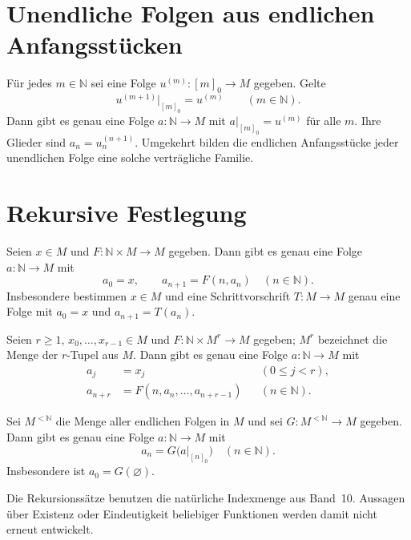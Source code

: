 \section{Unendliche Folgen aus endlichen Anfangsstücken}

\begin{theorem}
\label{b21guide:thm:prefixes}
Für jedes $m\in\mathbb N$ sei eine Folge
$u^{(m)}\colon[m]_0\to M$ gegeben. Gelte
\[
 u^{(m+1)}|_{[m]_0}=u^{(m)}
 \qquad(m\in\mathbb N).
\]
Dann gibt es genau eine Folge $a\colon\mathbb N\to M$ mit
$a|_{[m]_0}=u^{(m)}$ für alle $m$.
Ihre Glieder sind $a_n=u^{(n+1)}_n$.
Umgekehrt bilden die endlichen Anfangsstücke jeder unendlichen
Folge eine solche verträgliche Familie.
\end{theorem}

\section{Rekursive Festlegung}

\begin{theorem}
\label{b21guide:thm:recursion}
Seien $x\in M$ und $F\colon\mathbb N\times M\to M$ gegeben.
Dann gibt es genau eine Folge $a\colon\mathbb N\to M$ mit
\[
 a_0=x,\qquad a_{n+1}=F(n,a_n)\quad(n\in\mathbb N).
\]
Insbesondere bestimmen $x\in M$ und eine Schrittvorschrift
$T\colon M\to M$ genau eine Folge mit
$a_0=x$ und $a_{n+1}=T(a_n)$.
\end{theorem}

\begin{theorem}
\label{b21guide:thm:higher-recursion}
Seien $r\geq1$, $x_0,\ldots,x_{r-1}\in M$ und
$F\colon\mathbb N\times M^r\to M$ gegeben;
$M^r$ bezeichnet die Menge der $r$-Tupel aus $M$.
Dann gibt es genau eine Folge $a\colon\mathbb N\to M$ mit
\[
 \begin{aligned}
 a_j&=x_j &&(0\leq j<r),\\
 a_{n+r}&=F(n,a_n,\ldots,a_{n+r-1}) &&(n\in\mathbb N).
 \end{aligned}
\]
\end{theorem}

\begin{theorem}
Sei $M^{<\mathbb N}$ die Menge aller endlichen Folgen in $M$
und sei $G\colon M^{<\mathbb N}\to M$ gegeben.
Dann gibt es genau eine Folge $a\colon\mathbb N\to M$ mit
\[
 a_n=G\bigl(a|_{[n]_0}\bigr)\quad(n\in\mathbb N).
\]
Insbesondere ist $a_0=G(\varnothing)$.
\end{theorem}

Die Rekursionssätze benutzen die natürliche Indexmenge aus Band~10.
Aussagen über Existenz oder Eindeutigkeit beliebiger Funktionen
werden damit nicht erneut entwickelt.
